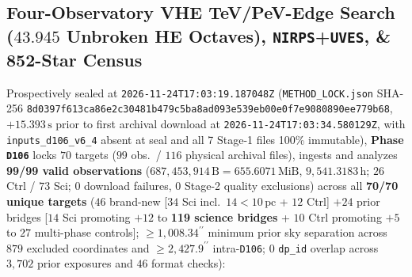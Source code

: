 \documentclass[twocolumn,10pt]{article}
\begin{document}
\subsection{Four-Observatory VHE TeV/PeV-Edge Search ($43.945$ Unbroken HE Octaves), \texttt{NIRPS}+\texttt{UVES}, \& 852-Star Census}
Prospectively sealed at \texttt{2026-11-24T17:03:19.187048Z} (\texttt{METHOD\_LOCK.json} SHA-256 \texttt{8d0397f6\allowbreak 13ca86e2\allowbreak c30481b4\allowbreak 79c5ba8a\allowbreak d093e539\allowbreak eb00e0f7\allowbreak e9080890\allowbreak ee779b68}, $+15.393\,\text{s}$ prior to first archival download at \texttt{2026-11-24T17:03:34.580129Z}, with \texttt{inputs\_d106\_v6\_4} absent at seal and all 7 Stage-1 files 100\% immutable), \textbf{Phase \texttt{D106}} locks $70$ targets ($99$ obs.\ / $116$ physical archival files), ingests and analyzes \textbf{99/99 valid observations} ($687{,}453{,}914\,\text{B} = 655.6071\,\text{MiB}$, $9{,}541.3183\,\text{h}$; $26$ Ctrl / $73$ Sci; $0$ download failures, $0$ Stage-2 quality exclusions) across all \textbf{70/70 unique targets} ($46$ brand-new [$34$ Sci incl.\ $14 < 10\,\text{pc}$ + $12$ Ctrl] $+ 24$ prior bridges [$14$ Sci promoting $+12$ to \textbf{119 science bridges} + $10$ Ctrl promoting $+5$ to $27$ multi-phase controls]; $\ge 1{,}008.34^{\prime\prime}$ minimum prior sky separation across $879$ excluded coordinates and $\ge 2{,}427.9^{\prime\prime}$ intra-\texttt{D106}; $0$ \texttt{dp\_id} overlap across $3{,}702$ prior exposures and $46$ format checks):
\end{document}
